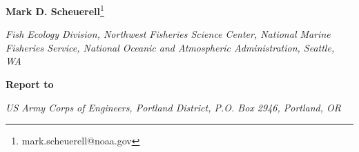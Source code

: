 \begin{center}
\textbf{Mark D. Scheuerell}\footnote{mark.scheuerell@noaa.gov}  


\textit{Fish Ecology Division, Northwest Fisheries Science Center, National Marine Fisheries Service, National Oceanic and Atmospheric Administration, Seattle, WA}


\vspace{0.2in}

\textbf{Report to}

\textit{US Army Corps of Engineers, Portland District, P.O. Box 2946, Portland, OR}
\end{center}

\newpage
